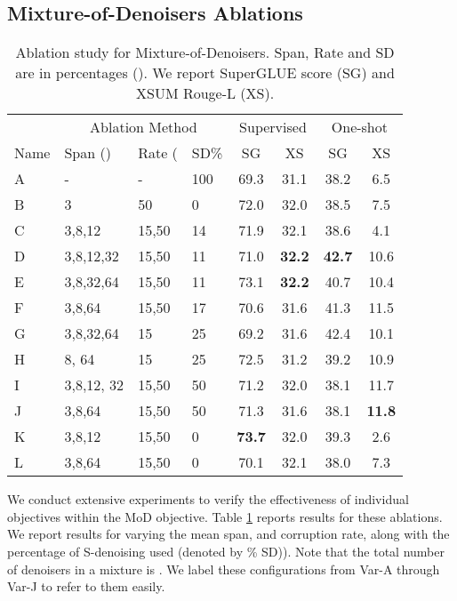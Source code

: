 \documentclass[10pt]{article}
\begin{document}
\subsection{Mixture-of-Denoisers Ablations}
\begin{table}[t]
    \centering
    \small
      \caption{Ablation study for Mixture-of-Denoisers. Span, Rate and SD are in percentages (). We report SuperGLUE score (SG) and XSUM Rouge-L (XS).}
    \label{tab:denoiser_ablation}\begin{tabular}{llllcccc}
    \toprule
       & \multicolumn{3}{c}{Ablation Method} & \multicolumn{2}{c}{Supervised}  &  \multicolumn{2}{c}{One-shot}  \\
        Name & Span () & Rate ( & SD\% & SG & XS & SG & XS \\
        \midrule
       A &  - & - & 100  & 69.3 & 31.1 & 38.2 & 6.5\\
        B & 3 & 50 & 0  &72.0 & 32.0 & 38.5 & 7.5\\
        \midrule
C &   3,8,12 & 15,50    & 14 & 71.9 & 32.1 & 38.6 & 4.1\\
 D &3,8,12,32 & 15,50 &  11 &71.0 & \textbf{32.2} & \textbf{42.7} & 10.6\\
 E & 3,8,32,64 & 15,50 & 11 &  73.1 & \textbf{32.2} & 40.7 & 10.4\\
 F & 3,8,64 & 15,50 & 17 & 70.6 & 31.6 & 41.3 & 11.5 \\
 G & 3,8,32,64 & 15 & 25 & 69.2 & 31.6 & 42.4 & 10.1\\ 
 H  & 8, 64 & 15 & 25 & 72.5 & 31.2 & 39.2 & 10.9 \\
  I & 3,8,12, 32 & 15,50 & 50 & 71.2 &32.0 & 38.1 & 11.7\\
  J & 3,8,64 & 15,50 & 50 & 71.3  &31.6 & 38.1& \textbf{11.8}\\
  K & 3,8,12 & 15,50 & 0 & \textbf{73.7}  & 32.0& 39.3 & 2.6\\
  L & 3,8,64 & 15,50 & 0 & 70.1 & 32.1& 38.0& 7.3\\
         \bottomrule
    \end{tabular}
  
\end{table}
We conduct extensive experiments to verify the effectiveness of individual objectives within the MoD objective. Table \ref{tab:denoiser_ablation} reports results for these ablations. We report results for varying the mean span, and corruption rate, along with the percentage of S-denoising used (denoted by \% SD)). Note that the total number of denoisers in a mixture is . 
We label these configurations from Var-A through Var-J to refer to them easily. 
\end{document}
